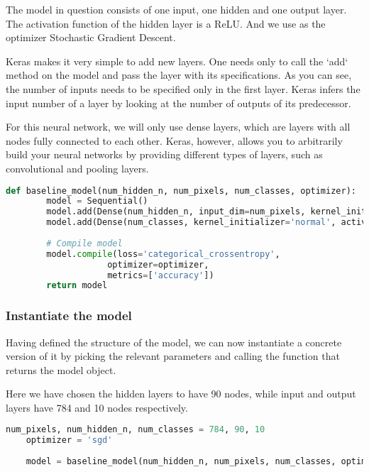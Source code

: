 The model in question consists of one input, one hidden and one output layer. The activation function of the hidden layer is a ReLU. And we use as the optimizer Stochastic Gradient Descent. 

Keras makes it very simple to add new layers. One needs only to call the `add` method on the model and pass the layer with its specifications. As you can see, the number of inputs needs to be specified only in the first layer. Keras infers the input number of a layer by looking at the number of outputs of its predecessor.

For this neural network, we will only use dense layers, which are layers with all nodes fully connected to each other. Keras, however, allows you to arbitrarily build your neural networks by providing different types of layers, such as convolutional and pooling layers.

\begin{lstlisting}[language=Python]
    def baseline_model(num_hidden_n, num_pixels, num_classes, optimizer):
        model = Sequential()
        model.add(Dense(num_hidden_n, input_dim=num_pixels, kernel_initializer='normal', activation='relu'))
        model.add(Dense(num_classes, kernel_initializer='normal', activation='softmax'))
        
        # Compile model
        model.compile(loss='categorical_crossentropy', 
                    optimizer=optimizer,
                    metrics=['accuracy'])
        return model
\end{lstlisting}

\subsubsection{Instantiate the model}

Having defined the structure of the model, we can now instantiate a concrete version of it by picking the relevant parameters and calling the function that returns the model object.

Here we have chosen the hidden layers to have 90 nodes, while input and output layers have 784 and 10 nodes respectively. 

\begin{lstlisting}[language=Python]
    num_pixels, num_hidden_n, num_classes = 784, 90, 10
    optimizer = 'sgd'
    
    model = baseline_model(num_hidden_n, num_pixels, num_classes, optimizer)
\end{lstlisting}


